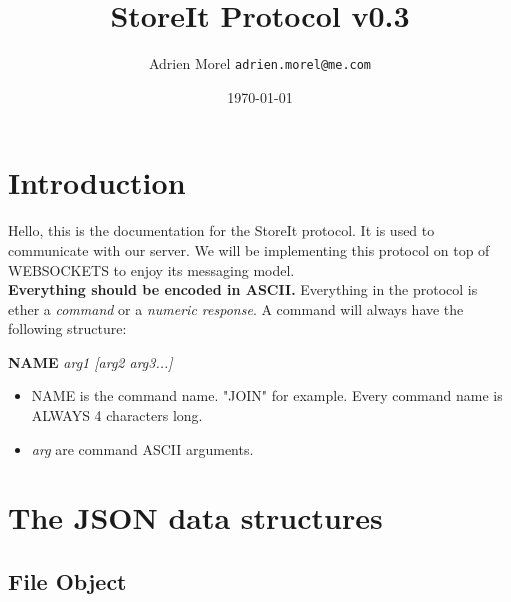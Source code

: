 \documentclass{article}
\begin{document}
  \title{StoreIt Protocol v0.3}
  \author{Adrien Morel \texttt{adrien.morel@me.com}}
  \date{\today}
  \maketitle

\section{Introduction}

Hello, this is the documentation for the StoreIt protocol. It is used to communicate with our server. We will be implementing this protocol on top of WEBSOCKETS to enjoy its messaging model.\\
\textbf{Everything should be encoded in ASCII.} Everything in the protocol is ether a \textit{command} or a \textit{numeric response}. A command will always have the following structure:\\
\begin{center}
\textbf{NAME} \textit{arg1 [arg2 arg3...]}
\end{center}

\begin{itemize}
  \item NAME is the command name. "JOIN" for example. Every command name is ALWAYS 4 characters long.
  \item \textit{arg} are command ASCII arguments.
\end{itemize}
\section{The JSON data structures}
\subsection{File Object}


\end{document}

